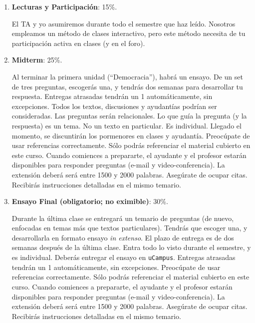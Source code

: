 \documentclass[letterpaper]{article}
\begin{document}
\begin{enumerate}

	\item {\bf Lecturas y Participaci\'on}: 15\%.

		El TA y yo asumiremos durante todo el semestre que haz le\'ido. Nosotros empleamos un m\'etodo de clases interactivo, pero este m\'etodo necesita de tu participaci\'on activa en clases (y en el foro).

	\item {\bf Midterm}: 25\%.

		Al terminar la primera unidad (``Democracia''), habr\'a un ensayo. De un set de tres preguntas, escoger\'as una, y tendr\'as dos semanas para desarrollar tu respuesta. Entregas atrasadas tendr\'an un 1 autom\'aticamente, sin excepciones. Todos los textos, discusiones y ayudant\'ias podr\'ian ser consideradas. Las preguntas ser\'an relacionales. Lo que gu\'ia la pregunta (y la respuesta) es un tema. No un texto en particular. Es individual. Llegado el momento, se discuntir\'an los pormenores en clases y ayudant\'ia. Preoc\'upate de usar referencias correctamente. S\'olo podr\'as referenciar el material cubierto en este curso. Cuando comiences a prepararte, el ayudante y el profesor estar\'an disponibles para responder preguntas (e-mail y video-conferencia). La extensi\'on deber\'a ser\'a entre 1500 y 2000 palabras. Aseg\'urate de ocupar citas. Recibir\'as instrucciones detalladas en el mismo temario.

	\item {\bf Ensayo Final (obligatorio; no eximible)}: 30\%. 

	Durante la \'ultima clase se entregar\'a un temario de preguntas (de nuevo, enfocadas en temas m\'as que textos particulares). Tendr\'as que escoger una, y desarrollarla en formato ensayo \emph{in extenso}. El plazo de entrega es de dos semanas despu\'es de la \'ultima clase. Entra todo lo visto durante el semestre, y es individual. Deber\'as entregar el ensayo en \texttt{uCampus}. Entregas atrasadas tendr\'an un 1 autom\'aticamente, sin excepciones. Preoc\'upate de usar referencias correctamente. S\'olo podr\'as referenciar el material cubierto en este curso. Cuando comiences a prepararte, el ayudante y el profesor estar\'an disponibles para responder preguntas (e-mail y video-conferencia). La extensi\'on deber\'a ser\'a entre 1500 y 2000 palabras. Aseg\'urate de ocupar citas. Recibir\'as instrucciones detalladas en el mismo temario.






\end{enumerate}
\end{document}
